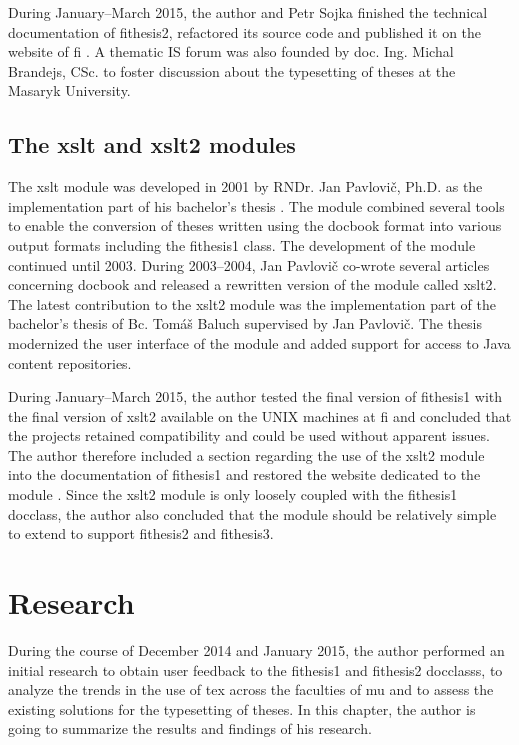 \documentclass[12pt,twoside,cover,color,table]%
  {fithesis3/fithesis3/fithesis3} %
\begin{document}
  During January--March 2015, the author and Petr Sojka finished
  the technical documentation of \textsf{fithesis2}, refactored its
  source code and published it on the website of \gls{fi}
  \cite{fithesisWeb}. A thematic IS forum \cite{fithesisForum} was
  also founded by doc. Ing. Michal Brandejs, CSc. to foster
  discussion about the typesetting of theses at the Masaryk
  University.

  \section{The \textsf{xslt} and \textsf{xslt2} modules}
  \label{sec:xslt}
  The \textsf{xslt} module was developed in 2001 by RNDr. Jan
  Pavlovič, Ph.D. as the implementation part of his bachelor's
  thesis \cite{PavlovicO1}. The module combined several tools to
  enable the conversion of theses written using the \gls{docbook}
  format into various output formats including the
  \textsf{fithesis1} class.  The development of the module
  continued until 2003. During 2003--2004, Jan Pavlovič co-wrote
  several articles concerning \gls{docbook} \cite{Pavlovic03,
  PitPav03, PitPav04} and released a rewritten version of the
  module called \textsf{xslt2}. The latest contribution to the
  \textsf{xslt2} module was the implementation part of the
  bachelor's thesis of Bc. Tomáš Baluch \cite{Baluch09} supervised
  by Jan Pavlovič. The thesis modernized the user interface of the
  module and added support for access to Java content repositories.

  During January--March 2015, the author tested the final version
  of \textsf{fithesis1} with the final version of \textsf{xslt2}
  available on the UNIX machines at \gls{fi} and concluded that the
  projects retained compatibility and could be used without
  apparent issues. The author therefore included a section
  regarding the use of the \textsf{xslt2} module into the
  documentation of \textsf{fithesis1} and restored the website
  dedicated to the module \cite{xslt2web}. Since the \textsf{xslt2}
  module is only loosely coupled with the \textsf{fithesis1}
  \gls{docclass}, the author also concluded that the module should
  be relatively simple to extend to support \textsf{fithesis2} and
  \textsf{fithesis3}.

\chapter{Research}
  During the course of December 2014 and January 2015, the author
  performed an initial research to obtain user feedback to the
  \textsf{fithesis1} and \textsf{fithesis2} \glspl{docclass}, to
  analyze the trends in the use of \gls{tex} across the faculties
  of \gls{mu} and to assess the existing solutions for the
  typesetting of theses. In this chapter, the author is going to
  summarize the results and findings of his research.
\end{document}
